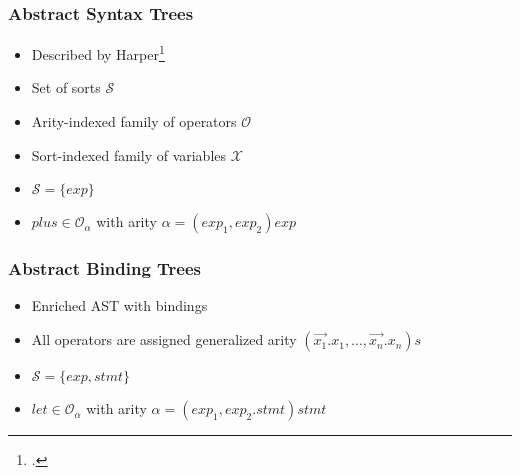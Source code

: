 \documentclass[t,24pt,aspectratio=169]{beamer}
\renewcommand{\vec}[1]{\overrightarrow{#1}}
\begin{document}
\begin{frame}
    \frametitle{Abstract Syntax Trees}
    \begin{multicols}{2}
        \begin{itemize}
            \item Described by Harper\footcite{harper}
            \item Set of sorts $\mathcal{S}$
            \item Arity-indexed family of operators $\mathcal{O}$
            \item Sort-indexed family of variables $\mathcal{X}$
        \end{itemize}

        \columnbreak
        \pause
        \begin{itemize}
            \item $\mathcal{S} = \{ exp \}$
            \item $plus \in \mathcal{O}_\alpha$ with arity $\alpha = (exp_1,exp_2)exp$
        \end{itemize}

    \end{multicols}

\end{frame}

\begin{frame}
    \frametitle{Abstract Binding Trees}
    \begin{multicols}{2}
        \begin{itemize}
            \item Enriched AST with bindings
            \item All operators are assigned generalized arity $(\vec{x_1}.x_1,...,\vec{x_n}.x_n)s$
        \end{itemize}
        \columnbreak
        \pause
        \begin{itemize}
            \item $\mathcal{S} = \{ exp, stmt \}$
            \item $let \in \mathcal{O}_\alpha$ with arity $\alpha = (exp_1,exp_2.stmt)stmt$
        \end{itemize}
    \end{multicols}

\end{frame}
\end{document}

